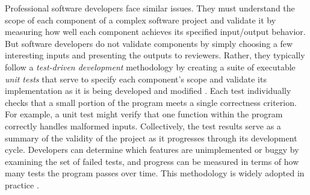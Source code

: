 \documentclass[9pt]{sig-alternate}
\begin{document}

Professional software developers face similar issues. 
They must understand the scope of each component of a complex software project and validate it by measuring how well each component achieves its specified input/output behavior. 
But software developers do not validate components by simply choosing a few interesting inputs and presenting the outputs to reviewers. 
Rather, they typically follow a \emph{test-driven development} methodology by creating a suite of executable \emph{unit tests} that serve to specify each component's scope and validate its implementation as it is being developed and modified \cite{beck2003}. 
Each test individually checks that a small portion of the program meets a single correctness criterion. For example, a unit test might verify that one function within the program correctly handles malformed inputs. 
Collectively, the test results serve as a summary of the validity of the project as it progresses through its development cycle. 
Developers can determine which features are unimplemented or buggy by examining the set of failed tests, and progress can be measured in terms of how many tests the program passes over time. 
This methodology is widely adopted in practice \cite{beck2003}.

\end{document}
